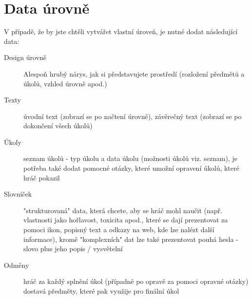 \documentclass[a4paper,12pt]{article}
\begin{document}
\section{Data úrovně}
V případě, že by jste chtěli vytvářet vlastní úroveň, je nutné dodat následující data:\\
\begin{description}
\item[Design úrovně] Alespoň hrubý nárys, jak si představujete prostředí (rozložení předmětů a úkolů, vzhled úrovně apod.)
\item[Texty] úvodní text (zobrazí se po načtení úrovně), závěrečný text (zobrazí se po dokončení všech úkolů)
\item[Úkoly] seznam úkolů - typ úkolu a data úkolu (možnosti úkolů viz. seznam), je potřeba také dodat pomocné otázky, které umožní opravení úkolů, které hráč pokazil 
\item[Slovníček] "strukturovaná" data, která chcete, aby se hráč mohl naučit (např. vlastnosti jako hořlavost, toxicita apod., které se dají prezentovat za pomoci ikon, popisný text a odkazy na web, kde lze nalézt další informace), kromě "komplexních" dat lze také prezentovat pouhá hesla - slovo plus jeho popis / vysvětelní
\item[Odměny] hráč za každý splnění úkol (případně po opravě za pomoci opravné otázky) dostavá předměty, které pak využije pro finální úkol
\end{description}
\end{document}
